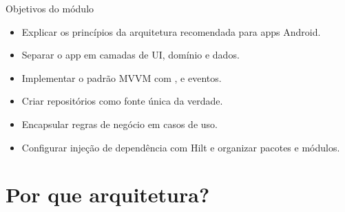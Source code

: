 \documentclass[aspectratio=169,10pt]{beamer}
\begin{document}
\capa

\begin{frame}{Objetivos do módulo}
  \begin{conceito}
    \begin{itemize}
      \item Explicar os princípios da arquitetura recomendada para apps Android.
      \item Separar o app em camadas de UI, domínio e dados.
      \item Implementar o padrão MVVM com ,  e eventos.
      \item Criar repositórios como fonte única da verdade.
      \item Encapsular regras de negócio em casos de uso.
      \item Configurar injeção de dependência com Hilt e organizar pacotes e módulos.
    \end{itemize}
  \end{conceito}
\end{frame}

\sumario



\section{Por que arquitetura?}
\end{document}
